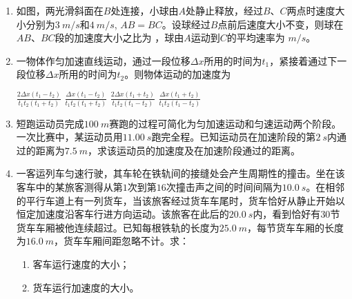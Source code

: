 \begin{enumerate}
\item 
{}
如图，两光滑斜面在$ B $处连接，小球由$ A $处静止释放，经过$ B $、$ C $两点时速度大小分别为$ 3 \ m/s $和$ 4 \ m/s $, $ AB=BC $。设球经过$ B $点前后速度大小不变，则球在$ AB $、$ BC $段的加速度大小之比为  ，球由$ A $运动到$ C $的平均速率为  $ m/s $。
\begin{figure}[h!]
\centering

\end{figure}

\item 
{}
一物体作匀加速直线运动，通过一段位移$ \Delta x $所用的时间为$ t_{1} $，紧接着通过下一段位移$ \Delta x $所用的时间为$ t_{2} $。则物体运动的加速度为  

\fourchoices
{$ \frac { 2 \Delta x \left( t _ { 1 } - t _ { 2 } \right) } { t _ { 1 } t _ { 2 } \left( t _ { 1 } + t _ { 2 } \right) } $}
{$ \frac { \Delta x \left( t _ { 1 } - t _ { 2 } \right) } { t _ { 1 } t _ { 2 } \left( t _ { 1 } + t _ { 2 } \right) } $}
{$ \frac { 2 \Delta x \left( t _ { 1 } + t _ { 2 } \right) } { t _ { 1 } t _ { 2 } \left( t _ { 1 } - t _ { 2 } \right) } $}
{$ \frac { \Delta x \left( t _ { 1 } + t _ { 2 } \right) } { t _ { 1 } t _ { 2 } \left( t _ { 1 } - t _ { 2 } \right) } $}


\item 
{}
短跑运动员完成$ 100 \ m $赛跑的过程可简化为匀加速运动和匀速运动两个阶段。一次比赛中，某运动员用$ 11.00 \ s $跑完全程。已知运动员在加速阶段的第$ 2 \ s $内通过的距离为$ 7.5\ m $，求该运动员的加速度及在加速阶段通过的距离。


\newpage
\item 
{}
一客运列车匀速行驶，其车轮在铁轨间的接缝处会产生周期性的撞击。坐在该客车中的某旅客测得从第$ 1 $次到第$ 16 $次撞击声之间的时间间隔为$ 10.0 \ s $。在相邻的平行车道上有一列货车，当该旅客经过货车车尾时，货车恰好从静止开始以恒定加速度沿客车行进方向运动。该旅客在此后的$ 20.0 \ s $内，看到恰好有$ 30 $节货车车厢被他连续超过。已知每根铁轨的长度为$ 25.0\ m $，每节货车车厢的长度为$ 16.0\ m $，货车车厢间距忽略不计。求：
\begin{enumerate}
\renewcommand{\labelenumi}{\arabic{enumi}.}
\item
客车运行速度的大小；
\item 
货车运行加速度的大小。




\end{enumerate}
\end{enumerate}
